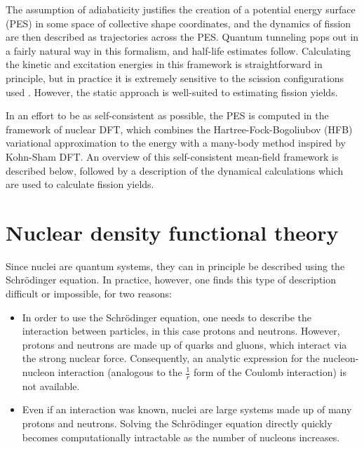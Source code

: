 The assumption of adiabaticity justifies the creation of a potential energy surface (PES) in some space of collective shape coordinates, and the dynamics of fission are then described as trajectories across the PES. Quantum tunneling pops out in a fairly natural way in this formalism, and half-life estimates follow. Calculating the kinetic and excitation energies in this framework is straightforward in principle, but in practice it is extremely sensitive to the scission configurations used \cite{Younes2011}. However, the static approach is well-suited to estimating fission yields.


In an effort to be as self-consistent as possible, the PES is computed in the framework of nuclear DFT, which combines the Hartree-Fock-Bogoliubov (HFB) variational approximation to the energy with a many-body method inspired by Kohn-Sham DFT. An overview of this self-consistent mean-field framework is described below, followed by a description of the dynamical calculations which are used to calculate fission yields.

\section{Nuclear density functional theory}
Since nuclei are quantum systems, they can in principle be described using the Schr\"{o}dinger equation. In practice, however, one finds this type of description difficult or impossible, for two reasons:

\begin{itemize}
\item In order to use the Schr\"{o}dinger equation, one needs to describe the interaction between particles, in this case protons and neutrons. However, protons and neutrons are made up of quarks and gluons, which interact via the strong nuclear force. Consequently, an analytic expression for the nucleon-nucleon interaction (analogous to the $\frac{1}{r}$ form of the Coulomb interaction) is not available.
\item Even if an interaction was known, nuclei are large systems made up of many protons and neutrons. Solving the Schr\"{o}dinger equation directly quickly becomes computationally intractable as the number of nucleons increases.
\end{itemize}

